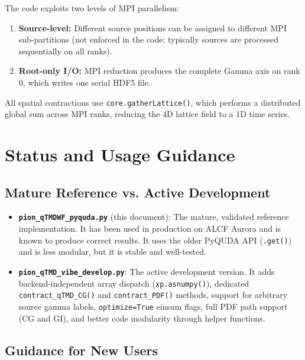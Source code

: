 \documentclass[11pt]{article}
\begin{document}
The code exploits two levels of MPI parallelism:

\begin{enumerate}
    \item \textbf{Source-level:} Different source positions can be assigned to different MPI sub-partitions (not enforced in the code; typically sources are processed sequentially on all ranks).
    \item \textbf{Root-only I/O:} MPI reduction produces the complete Gamma
    axis on rank 0, which writes one serial HDF5 file.
\end{enumerate}

All spatial contractions use \texttt{core.gatherLattice()}, which performs a distributed global sum across MPI ranks, reducing the 4D lattice field to a 1D time series.

\section{Status and Usage Guidance}
\label{sec:status}

\subsection{Mature Reference vs. Active Development}

\begin{itemize}
    \item \textbf{\texttt{pion\_qTMDWF\_pyquda.py}} (this document): The mature, validated reference implementation. It has been used in production on ALCF Aurora and is known to produce correct results. It uses the older PyQUDA API (\texttt{.get()}) and is less modular, but it is stable and well-tested.
    \item \textbf{\texttt{pion\_qTMD\_vibe\_develop.py}}: The active development version. It adds backend-independent array dispatch (\texttt{xp.asnumpy()}), dedicated \texttt{contract\_qTMD\_CG()} and \texttt{contract\_PDF()} methods, support for arbitrary source gamma labels, \texttt{optimize=True} einsum flags, full PDF path support (CG and GI), and better code modularity through helper functions.
\end{itemize}

\subsection{Guidance for New Users}
\end{document}
